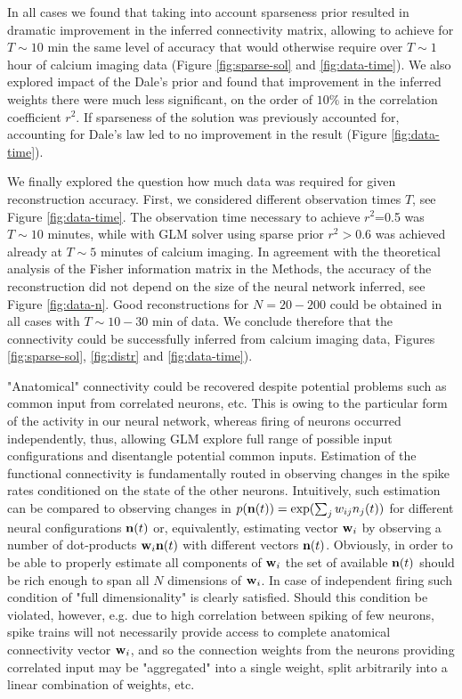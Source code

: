 In all cases we found that taking into account sparseness prior resulted in dramatic improvement in the inferred connectivity matrix, allowing to achieve for $T\sim 10$ min the same level of accuracy that would otherwise require over $T\sim 1$ hour of calcium imaging data (Figure \ref{fig:sparse-sol} and \ref{fig:data-time}). We also explored impact of the Dale's prior and found that improvement in the inferred weights there were much less significant, on the order of $10\%$ in the correlation coefficient $r^2$. If sparseness of the solution was previously accounted for, accounting for Dale's law led to no improvement in the result (Figure \ref{fig:data-time}).

We finally explored the question how much data was required for given reconstruction accuracy. First, we considered different observation times $T$, see Figure \ref{fig:data-time}. The observation time necessary to achieve $r^2$=0.5 was $T\sim 10$ minutes, while with GLM solver using sparse prior $r^2>0.6$ was achieved already at $T\sim 5$ minutes of calcium imaging. In agreement with the theoretical analysis of the Fisher information matrix in the Methods, the accuracy of the reconstruction did not depend on the size of the neural network inferred, see Figure \ref{fig:data-n}. Good reconstructions for $N=20-200$ could be obtained in all cases with $T\sim 10-30$ min of data. We conclude therefore that the connectivity could be successfully inferred from calcium imaging data, Figures \ref{fig:sparse-sol}, \ref{fig:distr} and \ref{fig:data-time}).

"Anatomical" connectivity could be recovered despite potential problems such as common input from correlated neurons, etc. This is owing to the particular form of the activity in our neural network, whereas firing of neurons occurred independently, thus, allowing GLM explore full range of possible input configurations and disentangle potential common inputs.  Estimation of the functional connectivity is fundamentally routed in observing changes in the spike rates conditioned on the state of the other neurons. Intuitively, such estimation can be compared to observing changes in $p({\bf n}(t))=\exp(\sum_j w_{ij}n_j(t))$ for different neural configurations ${\bf n}(t)$ or, equivalently, estimating vector ${\bf w}_i$ by observing a number of dot-products ${\bf w}_i {\bf n}(t)$ with different vectors ${\bf n}(t)$. Obviously, in order to be able to properly estimate all components of ${\bf w}_i$ the set of available ${\bf n}(t)$ should be rich enough to span all $N$ dimensions of ${\bf w}_i$. In case of independent firing such condition of "full dimensionality" is clearly satisfied.  Should this condition be violated, however, e.g. due to high correlation between spiking of few neurons, spike trains will not necessarily provide access to complete anatomical connectivity vector ${\bf w}_i$, and so the connection weights from the neurons providing correlated input may be "aggregated" into a single weight, split arbitrarily into a linear combination of weights, etc.

